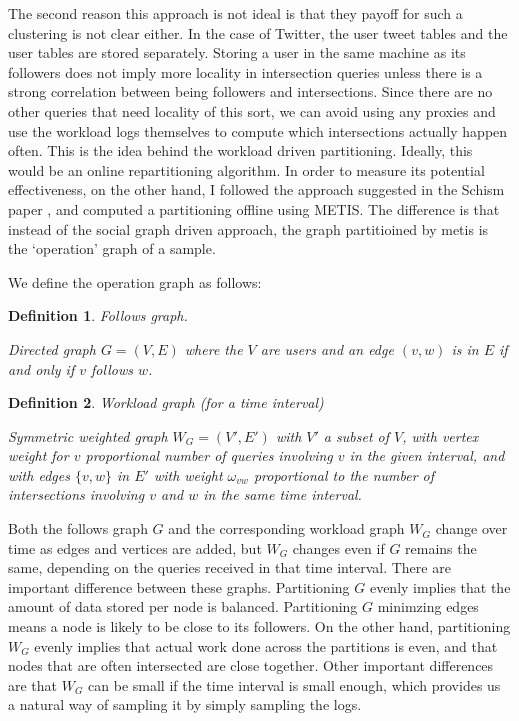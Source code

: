 The second reason this approach is not ideal is that they payoff for such a clustering is not clear either. In the case of Twitter, the user tweet tables  and the user tables are stored separately. Storing a user in the same machine as its followers does not imply more locality in intersection queries unless there is a strong correlation between being followers and intersections.  Since there are no other queries that need locality of this sort, we can avoid using any proxies and use the workload logs themselves to compute which intersections actually happen often.  This is the idea behind the workload driven partitioning. Ideally, this would be an online repartitioning algorithm.  In order to measure its potential effectiveness, on the other hand, I followed the approach suggested in the Schism paper \cite{schism}, and computed a partitioning offline using METIS. The difference is that instead of the social graph driven approach, the graph partitioined by metis is the `operation' graph of a sample. 

We define the operation graph as follows: 

\newtheorem{definition}{Definition}
\begin{definition}
  Follows graph.
  
  Directed graph $G = (V,E)$ where the $V$ are users and an edge $(v,w)$ is in $E$ if and only if $v$ follows $w$.
\end{definition}

\begin{definition}
  Workload graph (for a time interval) 

  Symmetric weighted graph $W_G = (V',E')$  with $V'$ a subset of $V$, with vertex weight for $v$ proportional number of queries involving $v$ in the given interval,  and with edges $\{v, w\}$ in $E'$ with weight $\omega_{vw}$ proportional to the number of intersections involving $v$ and $w$ in the same time interval.
\end{definition}

Both the follows graph $G$  and the corresponding workload graph $W_G$  change over time as edges and vertices are added, but  $W_G$ changes even if $G$ remains the same, depending on the queries received in that time interval.   There are important difference between these graphs. Partitioning $G$ evenly implies that the amount of data stored per node is balanced. Partitioning $G$ minimzing edges means a node is likely to be close to its followers.  On the other hand,  partitioning $W_G$ evenly implies that actual work done across the partitions is even, and that nodes that are often intersected are close together.   Other important differences are that $W_G$ can be small if the time interval is small enough, which provides us a natural way of sampling it by simply sampling the logs.  

